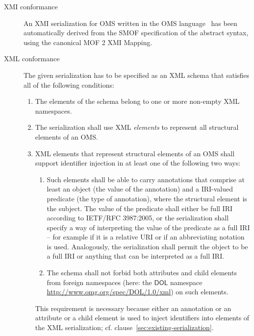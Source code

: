 \documentclass[10pt,fleqn,final]{scrreprt}
\makeatletter
\newcommand*{\eg}{e.g.\@\xspace}
\newcommand*\CommentAuthor{}
\renewcommand*\CommentAuthor{#1}}
\newcommand*\CommentDate{}
\renewcommand*\CommentDate{#1}}
\newcommand*\CommentId{}
\renewcommand*\CommentId{#1}}
\newcommand*\CommentType{}
\renewcommand*\CommentType{#1}}
\newcommand*{\SetCommentColorByType}[1]{%
\edef\localType{{#1}}%
\expandafter\ifstrequal\localType{q-aut}{\colorlet{CommentColor}{red}}{%
\expandafter\ifstrequal\localType{q-all}{\colorlet{CommentColor}{orange}}{%
\expandafter\ifstrequal\localType{todo}{\colorlet{CommentColor}{orange}}{%
\expandafter\ifstrequal\localType{fyi}{\colorlet{CommentColor}{lightgray}}{%
\colorlet{CommentColor}{yellow}}}}}}
\newcommand*{\SetCommentPrefixByType}[1]{%
\edef\localType{{#1}}%
\expandafter\@ifmtarg\localType{%
\edef\CommentPrefix{}%
}{%
\caseupper[q]{#1}%
\edef\CommentPrefix{\thestring: }%
}}
\newcommand*{\initComment}[1]{%
\setkeys{Comment}{#1}%
\SetCommentColorByType{\CommentType}%
\relax%
\SetCommentPrefixByType{\CommentType}%
\relax%
}
\newcommand*{\todonote}[2][]{%
\initComment{#1}%
\pdfcomment[author=\CommentAuthor,color=CommentColor,date=\CommentDate,id=\CommentId]{%
\CommentPrefix
#2}}
\renewcommand*{\todonote}[2][]{%
\initComment{#1}%
\ednote{\CommentPrefix #2}}
\newcommand*{\DOL}{\ensuremath{\mathsf{DOL}}\xspace}
\newcommand{\nisref}[1]{#1}
\makeatother
\begin{document}
\begin{description}
\item[XMI conformance]
An XMI serialization  for OMS written in the OMS language \ has been automatically derived from the SMOF specification
of the abstract syntax, using the canonical MOF 2 XMI Mapping.
\item[XML conformance]
The given serialization has to be specified as an XML schema that satisfies
 all of the following conditions:
\begin{enumerate}
\item The elements of the schema belong to one or more non-empty XML
namespaces.%
\item The serialization shall use XML \emph{elements} to represent all structural elements of an OMS.
\item XML elements that represent structural elements of an OMS shall support identifier injection in at least one of the following two ways:
  \begin{enumerate}
  \item\label{it:xml-annotation} Such elements shall be able to carry annotations that comprise at least an object (the value of the annotation) and a IRI-valued predicate (the type of annotation), where the structural element is the subject.
    The value of the predicate shall either be full IRI according to \nisref{IETF/RFC 3987:2005}, or the serialization shall specify a way of interpreting the value of the predicate as a full IRI – for example if it is a relative URI or if an abbreviating notation is used.
    Analogously, the serialization shall permit the object to be a full IRI or anything that can be interpreted as a full IRI.
  \item\label{it:foreign-xml-namespaces}
The schema shall not forbid both attributes and child elements from foreign namespaces (here: the
 \DOL namespace \url{http://www.omg.org/spec/DOL/1.0/xml}) on such elements.
  \end{enumerate}
  This requirement is necessary because either an annotation or an attribute or a child element is used to inject identifiers into elements of the XML serialization; cf. clause~\ref{sec:existing-serialization}.
\end{enumerate}


\end{description}
\end{document}
